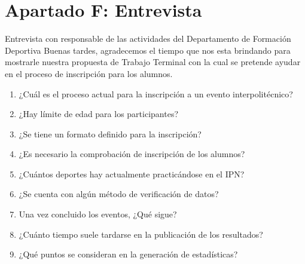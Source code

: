 	\section{Apartado F: Entrevista}
		Entrevista con responsable de las actividades del Departamento de Formación Deportiva
		Buenas tardes, agradecemos el tiempo que nos esta brindando para mostrarle nuestra propuesta de Trabajo Terminal con la cual se pretende ayudar en el proceso de inscripción para los alumnos.
		\label{Entrevista}
		\begin{enumerate}
			\item ¿Cuál es el proceso actual para la inscripción a un evento interpolitécnico?
			\item ¿Hay límite de edad para los participantes?
			\item ¿Se tiene un formato definido para la inscripción?
			\item ¿Es necesario la comprobación de inscripción de los alumnos?
			\item ¿Cuántos deportes hay actualmente practicándose en el IPN?
			\item ¿Se cuenta con algún método de verificación de datos?
			\item Una vez concluido los eventos, ¿Qué sigue?
			\item ¿Cuánto tiempo suele tardarse en la publicación de los resultados?
			\item ¿Qué puntos se consideran en la generación de estadísticas?
		\end{enumerate} 

